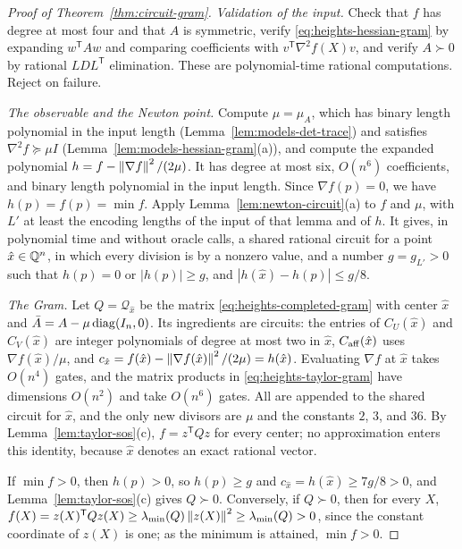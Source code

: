 \begin{proof}[Proof of Theorem~\ref{thm:circuit-gram}]
\emph{Validation of the input.} Check that $f$ has degree at most four and
that $A$ is symmetric, verify \eqref{eq:heights-hessian-gram} by expanding
$w^{\mathsf T}Aw$ and comparing coefficients with
$v^{\mathsf T}\nabla^2f(X)v$, and verify $A\succ0$ by rational
$LDL^{\mathsf T}$ elimination. These are polynomial-time rational
computations. Reject on failure.

\emph{The observable and the Newton point.} Compute $\mu=\mu_A$, which has
binary length polynomial in the input length
(Lemma~\ref{lem:models-det-trace}) and satisfies $\nabla^2f\succeq\mu I$
(Lemma~\ref{lem:models-hessian-gram}(a)), and compute the expanded polynomial
$h=f-\left\lVert\nabla f\right\rVert^2/(2\mu)$. It has degree at most six, $O(n^6)$
coefficients, and binary length polynomial in the input length. Since
$\nabla f(p)=0$, we have $h(p)=f(p)=\min f$. Apply
Lemma~\ref{lem:newton-circuit}(a) to $f$ and $\mu$, with $L'$ at least the
encoding lengths of the input of that lemma and of $h$. It gives, in
polynomial time and without oracle calls, a shared rational circuit for a
point $\hat x\in\mathbb Q^n$, in which every division is by a nonzero value, and a
number $g=g_{L'}>0$ such that $h(p)=0$ or $|h(p)|\ge g$, and
$|h(\hat x)-h(p)|\le g/8$.

\emph{The Gram.} Let $Q=\mathcal Q_{\hat x}$ be the matrix
\eqref{eq:heights-completed-gram} with center $\hat x$ and
$\bar A=A-\mu\operatorname{diag}(I_n,0)$. Its ingredients are circuits: the entries of
$C_U(\hat x)$ and $C_V(\hat x)$ are integer polynomials of degree at most two
in $\hat x$, $C_{\rm aff}(\hat x)$ uses $\nabla f(\hat x)/\mu$, and
$c_{\hat x}=f(\hat x)-\left\lVert\nabla f(\hat x)\right\rVert^2/(2\mu)=h(\hat x)$. Evaluating
$\nabla f$ at $\hat x$ takes $O(n^4)$ gates, and the matrix products in
\eqref{eq:heights-taylor-gram} have dimensions $O(n^2)$ and take $O(n^6)$
gates. All are appended to the shared circuit for $\hat x$, and the only new
divisors are $\mu$ and the constants $2$, $3$, and $36$. By
Lemma~\ref{lem:taylor-sos}(c), $f=z^{\mathsf T}Qz$ for every center; no
approximation enters this identity, because $\hat x$ denotes an exact rational
vector.

If $\min f>0$, then $h(p)>0$, so $h(p)\ge g$ and
$c_{\hat x}=h(\hat x)\ge7g/8>0$, and Lemma~\ref{lem:taylor-sos}(c) gives
$Q\succ0$. Conversely, if $Q\succ0$, then for every $X$,
$f(X)=z(X)^{\mathsf T}Qz(X)\ge\lambda_{\min}(Q)\left\lVert z(X)\right\rVert^2\ge
\lambda_{\min}(Q)>0$, since the constant coordinate of $z(X)$ is one; as the
minimum is attained, $\min f>0$.


\end{proof}
